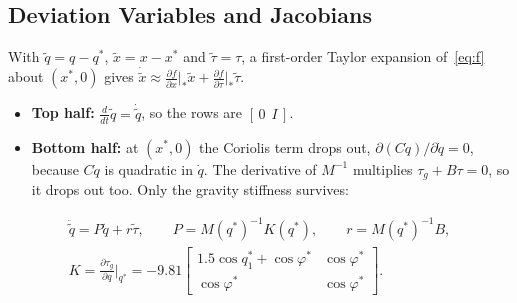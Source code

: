 \documentclass[12pt,a4paper]{article}
\begin{document}
\subsection{Deviation Variables and Jacobians}
With $\tilde q=q-q^*$, $\tilde x=x-x^*$ and $\tilde\tau=\tau$, a first-order Taylor expansion of~\eqref{eq:f} about $(x^*,0)$ gives $\dot{\tilde x}\approx\frac{\partial f}{\partial x}\big|_*\tilde x+\frac{\partial f}{\partial\tau}\big|_*\tilde\tau$.
\begin{itemize}
\item \textbf{Top half:} $\frac{d}{dt}\tilde q=\dot{\tilde q}$, so the rows are $[\,0\ \ I\,]$.
\item \textbf{Bottom half:} at $(x^*,0)$ the Coriolis term drops out, $\partial(C\dot q)/\partial\dot q=0$, because $C\dot q$ is quadratic in $\dot q$. The derivative of $M^{-1}$ multiplies $\tau_g+B\tau=0$, so it drops out too. Only the gravity stiffness survives:
\end{itemize}
\begin{gather}
\ddot{\tilde q}=P\tilde q+r\tilde\tau,\qquad P=M(q^*)^{-1}K(q^*),\qquad r=M(q^*)^{-1}B,\\
K=\frac{\partial\tau_g}{\partial q}\Big|_{q^*}=-9.81\begin{bmatrix}1.5\cos q_1^*+\cos\varphi^* & \cos\varphi^*\\ \cos\varphi^* & \cos\varphi^*\end{bmatrix}.\nonumber
\end{gather}
\end{document}
